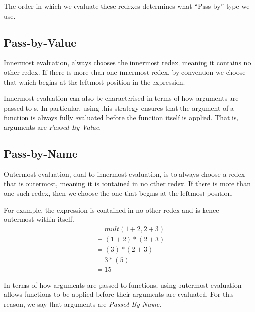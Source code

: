 The order in which we evaluate these redexes determines what ``Pass-by'' type we use.

\subsection{Pass-by-Value}\label{subsec:Pass_by_Value}
Innermost evaluation, always chooses the innermost redex, meaning it contains no other redex.
If there is more than one innermost redex, by convention we choose that which begins at the leftmost position in the expression.

Innermost evaluation can also be characterised in terms of how arguments are passed to s.
In particular, using this strategy ensures that the argument of a function is always fully evaluated before the function itself is applied.
That is, arguments are \emph{Passed-By-Value}.

\subsection{Pass-by-Name}\label{subsec:Pass_by_Name}
Outermost evaluation, dual to innermost evaluation, is to always choose a redex that is outermost, meaning it is contained in no other redex.
If there is more than one such redex, then we choose the one that begins at the leftmost position.

For example, the expression  is contained in no other redex and is hence outermost within itself.
\begin{align*}
  &= mult(1+2, 2+3) \\
  &= (1+2) * (2+3) \\
  &= (3) * (2+3) \\
  &= 3 * (5) \\
  &= 15
\end{align*}

In terms of how arguments are passed to functions, using outermost evaluation allows functions to be applied before their arguments are evaluated.
For this reason, we say that arguments are \emph{Passed-By-Name}.


